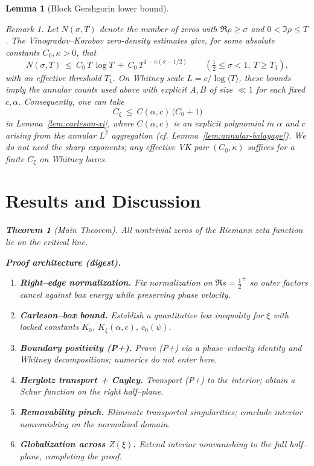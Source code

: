 \documentclass[11pt]{article}
\newtheorem{theorem}{Theorem}[section]
\newtheorem{lemma}{Lemma}[section]
\theoremstyle{definition}
\theoremstyle{remark}
\newtheorem{remark}{Remark}[section]
\begin{document}
\begin{lemma}[Block Gershgorin lower bound]
\begin{remark}
Let $N(\sigma,T)$ denote the number of zeros with $\Re\rho\ge \sigma$ and $0<\Im\rho\le T$. The Vinogradov–Korobov zero-density estimates give, for some absolute constants $C_0,\kappa>0$, that
\[
  N(\sigma,T)\ \le\ C_0\,T\,\log T\ +\ C_0\,T^{1-\kappa(\sigma-1/2)}\qquad (\tfrac12\le \sigma<1,\ T\ge T_1),
\]
with an effective threshold $T_1$. On Whitney scale $L=c/\log\langle T\rangle$, these bounds imply the annular counts used above with explicit $A,B$ of size $\ll 1$ for each fixed $c,\alpha$. Consequently, one can take
\[
  C_\xi\ \le\ C(\alpha,c)\,\big(C_0+1\big)
\]
in Lemma~\ref{lem:carleson-xi}, where $C(\alpha,c)$ is an explicit polynomial in $\alpha$ and $c$ arising from the annular $L^2$ aggregation (cf. Lemma~\ref{lem:annular-balayage}). We do not need the sharp exponents; any effective VK pair $(C_0,\kappa)$ suffices for a finite $C_\xi$ on Whitney boxes.
\end{remark}




\vspace{1.0cm}
\section{Results and Discussion}\label{sec:results}  %
\begin{theorem}[Main Theorem]
All nontrivial zeros of the Riemann zeta function lie on the critical line.
\end{theorem}

\noindent\textbf{Proof architecture (digest).}
\begin{enumerate}
  \item \textbf{Right–edge normalization.} Fix normalization on $\Re s=\tfrac12^+$ so outer factors cancel against box energy while preserving phase velocity.
  \item \textbf{Carleson–box bound.} Establish a quantitative box inequality for $\xi$ with locked constants $K_0$, $K_\xi(\alpha,c)$, $c_0(\psi)$.
  \item \textbf{Boundary positivity (P+).} Prove (P+) via a phase–velocity identity and Whitney decompositions; numerics do not enter here.
  \item \textbf{Herglotz transport + Cayley.} Transport (P+) to the interior; obtain a Schur function on the right half–plane.
  \item \textbf{Removability pinch.} Eliminate transported singularities; conclude interior nonvanishing on the normalized domain.
  \item \textbf{Globalization across $Z(\xi)$.} Extend interior nonvanishing to the full half–plane, completing the proof.
\end{enumerate}


\end{lemma}
\end{document}
